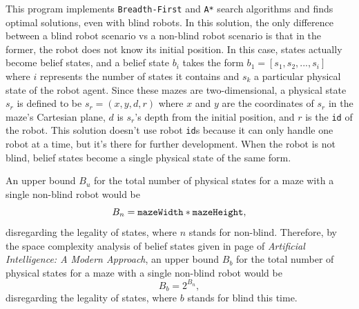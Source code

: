 \documentclass{article}
\begin{document}
This program implements \verb`Breadth-First` and \verb`A*` search algorithms and finds optimal solutions, even with blind robots. In this solution, the only difference between a blind robot scenario vs a non-blind robot scenario is that in the former, the robot does not know its initial position. In this case, states actually become belief states, and a belief state  $b_i$ takes the form $b_1 = [s_1, s_2, ..., s_i]$ where $i$ represents the number of states it contains and $s_k$ a particular physical state of the robot agent. Since these mazes are two-dimensional, a physical state $s_r$ is defined to be $s_r = (x, y, d, r)$  where $x$ and $y$ are the coordinates of $s_r$ in the maze's Cartesian plane, $d$ is $s_r$'s depth from the initial position, and $r$ is the \verb`id` of the robot. This solution doesn't use robot \verb`id`s because it can only handle one robot at a time, but it's there for further development. When the robot is not blind, belief states become a single physical state of the same form.

An upper bound $B_u$ for the total number of physical states for a maze with a single non-blind robot would be 
\[
  B_n = \verb`mazeWidth` * \verb`mazeHeight`,
\]
disregarding the legality of states, where $n$ stands for non-blind. Therefore, by the space complexity analysis of belief states given in page of {\it Artificial Intelligence: A Modern Approach}, an upper bound $B_b$ for the total number of physical states for a maze with a single non-blind robot would be 
\[
  B_b = 2^{B_n},
\]
disregarding the legality of states, where $b$ stands for blind this time.
\end{document}
